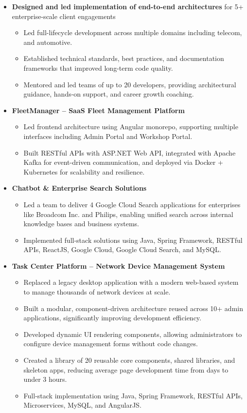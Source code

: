 \documentclass[letterpaper,11pt]{article}
\newcommand{\resumeItem}[1]{
  \item\large{
    {#1 \vspace{2pt}}
  }
}
\newcommand{\resumeItemListStart}{\begin{itemize}[leftmargin=0.15in, label=\textbullet, itemsep=1pt]}
\newcommand{\resumeItemListEnd}{\end{itemize}\vspace{1pt}}
\begin{document}
\resumeItemListStart
\resumeItem{\textbf{Designed and led implementation of end-to-end architectures} for 5+ enterprise-scale client engagements}
\begin{itemize}[leftmargin=0.15in, label={--}, itemsep=0pt, topsep=1pt]
    \item Led full-lifecycle development across multiple domains including telecom, and automotive.
    \item Established technical standards, best practices, and documentation frameworks that improved long-term code quality.
    \item Mentored and led teams of up to 20 developers, providing architectural guidance, hands-on support, and career growth coaching.
\end{itemize}

\resumeItem{\textbf{FleetManager – SaaS Fleet Management Platform}}
\begin{itemize}[leftmargin=0.15in, label={--}, itemsep=0pt, topsep=1pt]
    \item Led frontend architecture using Angular monorepo, supporting multiple interfaces including Admin Portal and Workshop Portal.
    \item Built RESTful APIs with ASP.NET Web API, integrated with Apache Kafka for event-driven communication, and deployed via Docker + Kubernetes for scalability and resilience.
\end{itemize}

\resumeItem{\textbf{Chatbot \& Enterprise Search Solutions}}
\begin{itemize}[leftmargin=0.15in, label={--}, itemsep=0pt, topsep=1pt]
    \item Led a team to deliver 4 Google Cloud Search applications for enterprises like Broadcom Inc. and Philips, enabling unified search across internal knowledge bases and business systems.
    \item Implemented full-stack solutions using Java, Spring Framework, RESTful APIs, ReactJS, Google Cloud, Google Cloud Search, and MySQL.
\end{itemize}

\resumeItem{\textbf{Task Center Platform – Network Device Management System}}
\begin{itemize}[leftmargin=0.15in, label={--}, itemsep=0pt, topsep=1pt]
    \item Replaced a legacy desktop application with a modern web-based system to manage thousands of network devices at scale.
    \item Built a modular, component-driven architecture reused across 10+ admin applications, significantly improving development efficiency.
    \item Developed dynamic UI rendering components, allowing administrators to configure device management forms without code changes.
    \item Created a library of 20 reusable core components, shared libraries, and skeleton apps, reducing average page development time from days to under 3 hours.
    \item Full-stack implementation using Java, Spring Framework, RESTful APIs, Microservices, MySQL, and AngularJS.
\end{itemize}
\resumeItemListEnd
\end{document}
